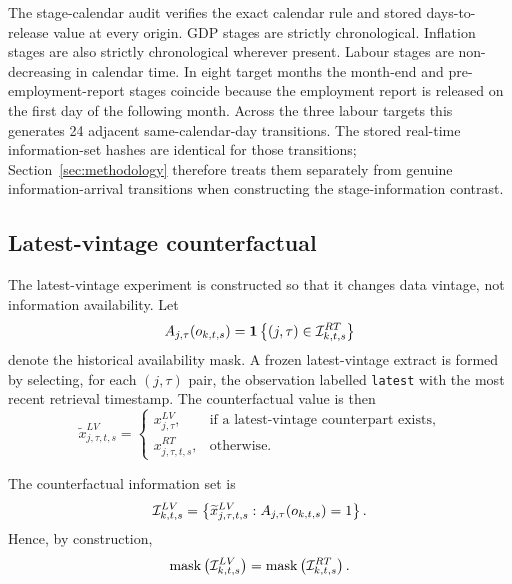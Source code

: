 The stage-calendar audit verifies the exact calendar rule and stored
days-to-release value at every origin. GDP stages are strictly chronological.
Inflation stages are also strictly chronological wherever present. Labour
stages are non-decreasing in calendar time. In eight target months the
month-end and pre-employment-report stages coincide because the employment
report is released on the first day of the following month. Across the three
labour targets this generates 24 adjacent same-calendar-day transitions. The
stored real-time information-set hashes are identical for those transitions;
Section~\ref{sec:methodology} therefore treats them separately from genuine
information-arrival transitions when constructing the stage-information
contrast.

\subsection{Latest-vintage counterfactual}

The latest-vintage experiment is constructed so that it changes data vintage,
not information availability. Let
\begin{equation}
    A_{j,\tau}(o_{k,t,s})
    =
    \mathbf{1}
    \left\{
        (j,\tau)
        \in
        \mathcal{I}^{RT}_{k,t,s}
    \right\}
    \label{eq:availability_mask}
\end{equation}
denote the historical availability mask. A frozen latest-vintage extract is
formed by selecting, for each $(j,\tau)$ pair, the observation labelled
\texttt{latest} with the most recent retrieval timestamp. The counterfactual
value is then
\begin{equation}
    \widetilde{x}^{LV}_{j,\tau,t,s}
    =
    \begin{cases}
        x^{LV}_{j,\tau},
        &
        \text{if a latest-vintage counterpart exists},
        \\[4pt]
        x^{RT}_{j,\tau,t,s},
        &
        \text{otherwise}.
    \end{cases}
    \label{eq:masked_latest_value}
\end{equation}

The counterfactual information set is
\begin{equation}
    \mathcal{I}^{LV}_{k,t,s}
    =
    \left\{
        \widetilde{x}^{LV}_{j,\tau,t,s}
        :
        A_{j,\tau}(o_{k,t,s})=1
    \right\}.
    \label{eq:latest_information_set}
\end{equation}
Hence, by construction,
\begin{equation}
    \operatorname{mask}
    \left(
        \mathcal{I}^{LV}_{k,t,s}
    \right)
    =
    \operatorname{mask}
    \left(
        \mathcal{I}^{RT}_{k,t,s}
    \right).
    \label{eq:mask_invariance}
\end{equation}

